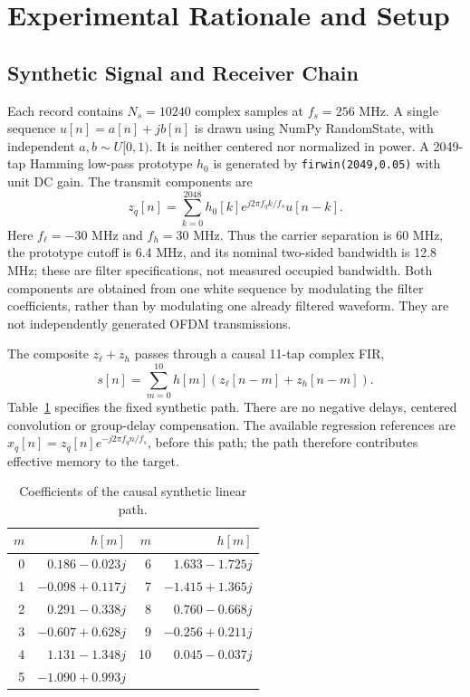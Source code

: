 \documentclass[conference]{IEEEtran}
\begin{document}
\section{Experimental Rationale and Setup}\label{sec:setup}
\subsection{Synthetic Signal and Receiver Chain}
Each record contains $N_s=10240$ complex samples at $f_s=256$ MHz. A single sequence $u[n]=a[n]+jb[n]$ is drawn using NumPy RandomState, with independent $a,b\sim U[0,1)$. It is neither centered nor normalized in power. A 2049-tap Hamming low-pass prototype $h_0$ is generated by \texttt{firwin(2049,0.05)} with unit DC gain. The transmit components are
\begin{equation}
 z_q[n]=\sum_{k=0}^{2048}h_0[k]e^{j2\pi f_qk/f_s}u[n-k].
 \label{eq:tx-generation}
\end{equation}
Here $f_\ell=-30$ MHz and $f_h=30$ MHz. Thus the carrier separation is 60 MHz, the prototype cutoff is 6.4 MHz, and its nominal two-sided bandwidth is 12.8 MHz; these are filter specifications, not measured occupied bandwidth. Both components are obtained from one white sequence by modulating the filter coefficients, rather than by modulating one already filtered waveform. They are not independently generated OFDM transmissions.

The composite $z_\ell+z_h$ passes through a causal 11-tap complex FIR,
\begin{equation}
 s[n]=\sum_{m=0}^{10}h[m](z_\ell[n-m]+z_h[n-m]).
 \label{eq:linear-path}
\end{equation}
Table~\ref{tab:path} specifies the fixed synthetic path. There are no negative delays, centered convolution or group-delay compensation. The available regression references are $x_q[n]=z_q[n]e^{-j2\pi f_qn/f_s}$, before this path; the path therefore contributes effective memory to the target.
\begin{table}[!t]
\caption{Coefficients of the causal synthetic linear path.}\label{tab:path}
\centering\scriptsize
\begin{tabular}{rr@{\qquad}rr}\toprule
$m$ & $h[m]$ & $m$ & $h[m]$\\\midrule
0 & $0.186-0.023j$ & 6 & $1.633-1.725j$\\
1 & $-0.098+0.117j$ & 7 & $-1.415+1.365j$\\
2 & $0.291-0.338j$ & 8 & $0.760-0.668j$\\
3 & $-0.607+0.628j$ & 9 & $-0.256+0.211j$\\
4 & $1.131-1.348j$ & 10 & $0.045-0.037j$\\
5 & $-1.090+0.993j$ & & \\\bottomrule
\end{tabular}
\end{table}
\end{document}
